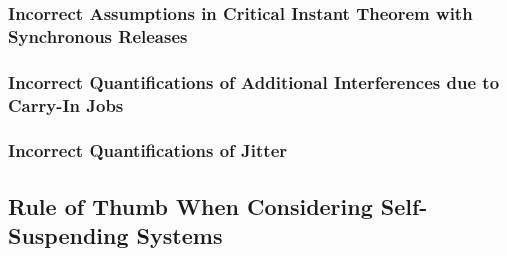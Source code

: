 \subsubsection{Incorrect Assumptions in Critical Instant Theorem with Synchronous Releases}
\subsubsection{Incorrect Quantifications of Additional Interferences due to Carry-In Jobs}
\subsubsection{Incorrect Quantifications of Jitter}
\subsection{Rule of Thumb When Considering Self-Suspending Systems}
  
  
  
  
  
  
  
  
  
  